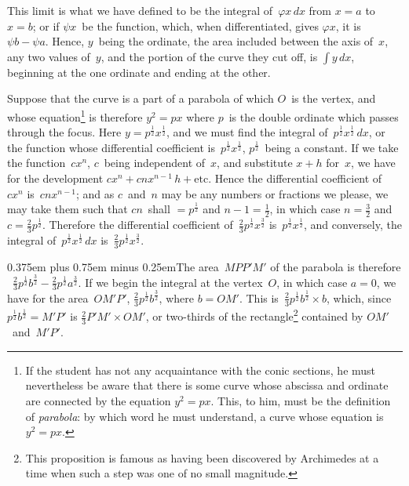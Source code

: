 \documentclass[12pt]{book}[2005/09/16]
\newcommand{\Loosen}{\spaceskip 0.375em plus 0.75em minus 0.25em}
\newcommand{\Pagelabel}[1]{\phantomsection\label{page:#1}}
\newcommand{\PageSep}[1]{\Pagelabel{#1}\ignorespaces}
\renewcommand{\etc}{\text{etc}}
\renewcommand{\(}{{\upshape(}}
\renewcommand{\)}{{\upshape)}}
\renewcommand{\phi}{\varphi}
\newcommand{\efrac}[2]{\frac{#1}{#2}}
\begin{document}
This limit is what we have defined to be the integral
of~$\phi x\, dx$ from $x = a$ to $x = b$; or if $\psi x$~be the
function, which, when differentiated, gives $\phi x$, it is
$\psi b - \psi a$. Hence, $y$~being the ordinate, the area included
between the axis of~$x$, any two values of~$y$, and
the portion of the curve they cut off, is $\int y\, dx$, beginning
at the one ordinate and ending at the other.

Suppose that the curve is a part of a parabola
of which $O$~is the vertex, and whose equation\footnote
  {If the student has not any acquaintance with the conic sections, he must
  nevertheless be aware that there is some curve whose abscissa and ordinate
  are connected by the equation $y^{2} = px$. This, to him, must be the definition
  of \emph{parabola}: by which word he must understand, a curve whose equation is
  $y^{2} = px$.}
is
\PageSep{127}
therefore $y^{2} = px$ where $p$~is the double ordinate which
passes through the focus. Here $y = p^{\efrac{1}{2}} x^{\efrac{1}{2}}$, and we
must find the integral of~$p^{\efrac{1}{2}} x^{\efrac{1}{2}}\, dx$, or the function
whose differential coefficient is~$p^{\efrac{1}{2}} x^{\efrac{1}{2}}$, $p^{\efrac{1}{2}}$~being a constant.
If we take the function~$cx^{n}$, $c$~being independent
of~$x$, and substitute $x + h$ for~$x$, we have for the
development $cx^{n} + cnx^{n-1}\, h + \etc$. Hence the differential
coefficient of~$cx^{n}$ is~$cnx^{n-1}$; and as $c$~and~$n$ may
be any numbers or fractions we please, we may take
them such that $cn$~shall $= p^{\efrac{1}{2}}$ and $n - 1 = \frac{1}{2}$, in which
case $n = \frac{3}{2}$ and $c = \frac{2}{3}p^{\efrac{1}{2}}$. Therefore the differential coefficient
of~$\frac{2}{3} p^{\efrac{1}{2}} x^{\efrac{3}{2}}$ is~$p^{\efrac{1}{2}} x^{\efrac{1}{2}}$, and conversely, the integral
of~$p^{\efrac{1}{2}} x^{\efrac{1}{2}}\, dx$ is~$\frac{2}{3} p^{\efrac{1}{2}} x^{\efrac{3}{2}}$.

{\Loosen The area~$MPP'M'$ of the parabola is therefore
%
~$\frac{2}{3} p^{\efrac{1}{2}} b^{\efrac{3}{2}} - \frac{2}{3} p^{\efrac{1}{2}} a^{\efrac{3}{2}}$. If we begin the integral at the vertex~$O$,
in which case $a = 0$, we have for the area~$OM'P'$,
$\frac{2}{3} p^{\efrac{1}{2}} b^{\efrac{3}{2}}$, where $b = OM'$. This is~$\frac{2}{3} p^{\efrac{1}{2}} b^{\efrac{1}{2}} × b$, which, since
$p^{\efrac{1}{2}} b^{\efrac{1}{2}} = M'P'$ is $\frac{2}{3}P'M' × OM'$, or two-thirds of the rectangle\footnote
  {This proposition is famous as having been discovered by Archimedes
%
  at a time when such a step was one of no small magnitude.}
contained by $OM'$~and~$M'P'$.}
\end{document}
